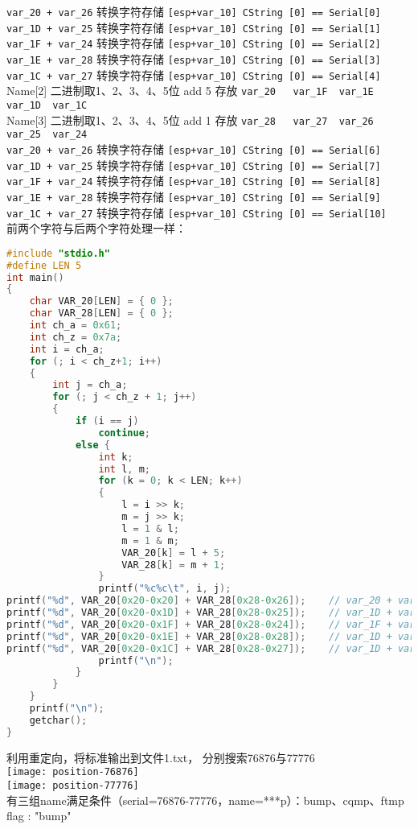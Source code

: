 \begin{enumerate}
\lstinline$var_20 + var_26$	转换字符存储	\lstinline$[esp+var_10] CString	[0] == Serial[0]$\\
\lstinline$var_1D + var_25$	转换字符存储	\lstinline$[esp+var_10] CString	[0] == Serial[1]$\\
\lstinline$var_1F + var_24$	转换字符存储	\lstinline$[esp+var_10] CString	[0] == Serial[2]$\\
\lstinline$var_1E + var_28$	转换字符存储	\lstinline$[esp+var_10] CString	[0] == Serial[3]$\\
\lstinline$var_1C + var_27$	转换字符存储	\lstinline$[esp+var_10] CString	[0] == Serial[4]$\\



Name[2]		二进制取1、2、3、4、5位 add 5 存放	\lstinline$var_20	var_1F	var_1E	var_1D	var_1C$\\
Name[3]		二进制取1、2、3、4、5位 add 1 存放	\lstinline$var_28	var_27	var_26	var_25	var_24$\\

\lstinline$var_20 + var_26$	转换字符存储	\lstinline$[esp+var_10] CString	[0] == Serial[6]$\\
\lstinline$var_1D + var_25$	转换字符存储	\lstinline$[esp+var_10] CString	[0] == Serial[7]$\\
\lstinline$var_1F + var_24$	转换字符存储	\lstinline$[esp+var_10] CString	[0] == Serial[8]$\\
\lstinline$var_1E + var_28$	转换字符存储	\lstinline$[esp+var_10] CString	[0] == Serial[9]$\\
\lstinline$var_1C + var_27$	转换字符存储	\lstinline$[esp+var_10] CString	[0] == Serial[10]$\\
	前两个字符与后两个字符处理一样：\\
	\begin{lstlisting}[language=C]
#include "stdio.h"
#define LEN 5
int main()
{
	char VAR_20[LEN] = { 0 };
	char VAR_28[LEN] = { 0 };
	int ch_a = 0x61;
	int ch_z = 0x7a;
	int i = ch_a;
	for (; i < ch_z+1; i++)
	{
		int j = ch_a;
		for (; j < ch_z + 1; j++)
		{
			if (i == j)
				continue;
			else {
				int k;
				int l, m;
				for (k = 0; k < LEN; k++)
				{
					l = i >> k;
					m = j >> k;
					l = 1 & l;
					m = 1 & m;
					VAR_20[k] = l + 5;
					VAR_28[k] = m + 1;
				}
				printf("%c%c\t", i, j);
printf("%d", VAR_20[0x20-0x20] + VAR_28[0x28-0x26]);	// var_20 + var_26
printf("%d", VAR_20[0x20-0x1D] + VAR_28[0x28-0x25]);	// var_1D + var_25
printf("%d", VAR_20[0x20-0x1F] + VAR_28[0x28-0x24]);	// var_1F + var_24
printf("%d", VAR_20[0x20-0x1E] + VAR_28[0x28-0x28]);	// var_1D + var_28
printf("%d", VAR_20[0x20-0x1C] + VAR_28[0x28-0x27]);	// var_1D + var_27
				printf("\n");
			}
		}
	}
	printf("\n");
	getchar();
}
	\end{lstlisting}
	利用重定向，将标准输出到文件1.txt， 分别搜索76876与77776\\
	\texttt{[image: position-76876]} \\
	\texttt{[image: position-77776]} \\
	有三组name满足条件（serial=76876-77776，name=***p）：bump、cqmp、ftmp \\
	flag : "bump"
\end{enumerate}